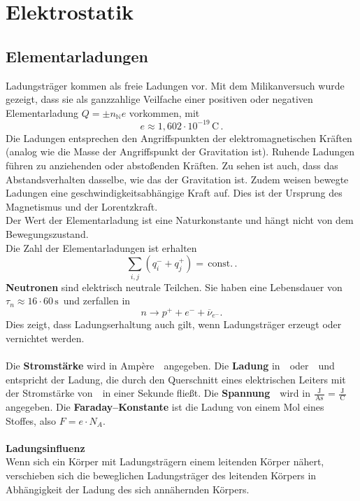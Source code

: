 \documentclass[a4paper,12pt]{article}
\begin{document}
\newpage
\section{Elektrostatik}
\subsection{Elementarladungen}
Ladungsträger kommen als freie Ladungen vor. Mit dem Milikanversuch wurde gezeigt, dass sie als ganzzahlige Veilfache einer positiven oder negativen Elementarladung $Q=\pm n_\mathbb{N} e$ vorkommen, mit
\[ 
        e\approx 1,602\cdot 10^{-19}\,\text{C}\,
.\] 
Die Ladungen entsprechen den Angriffspunkten der elektromagnetischen Kräften (analog wie die Masse der Angriffspunkt der Gravitation ist). Ruhende Ladungen führen zu anziehenden oder abstoßenden Kräften. Zu sehen ist auch, dass das Abstandsverhalten dasselbe, wie das der Gravitation ist. Zudem weisen bewegte Ladungen eine geschwindigkeitsabhängige Kraft auf. Dies ist der Ursprung des Magnetismus und der Lorentzkraft.\\\indent
Der Wert der Elementarladung ist eine Naturkonstante und hängt nicht von dem Bewegungszustand.\\\indent
Die Zahl der Elementarladungen ist erhalten
\[ 
        \sum_{i,j}^{}\left(q^-_i+q^+_j\right)=\,\text{const.}\,
.\] 
\textbf{Neutronen} sind elektrisch neutrale Teilchen. Sie haben eine Lebensdauer von $\tau _n\approx 16\cdot 60\,\text{s}\,$ und zerfallen in
\[ 
        n\rightarrow p^++e^-+\overline{\nu }_{e^-}
.\] 
Dies zeigt, dass Ladungserhaltung auch gilt, wenn Ladungsträger erzeugt oder vernichtet werden.\\\\\indent
Die \textbf{Stromstärke} wird in Amp\`ere \,\, angegeben. Die \textbf{Ladung} in \,\, oder \,\, und entspricht der Ladung, die durch den Querschnitt eines elektrischen Leiters mit der Stromstärke von \,\, in einer Sekunde fließt. Die \textbf{Spannung} \,\, wird in $\tfrac{\,\text{J}\,}{\,\text{As}\,}=\tfrac{\,\text{J}\,}{\,\text{C}\,}$ angegeben. Die \textbf{Faraday--Konstante} ist die Ladung von einem Mol eines Stoffes, also $F=e\cdot N_A$.  
\\\hfill\\\textbf{Ladungsinfluenz}\\ 
Wenn sich ein Körper mit Ladungsträgern einem leitenden Körper nähert, verschieben sich die beweglichen Ladungsträger des leitenden Körpers in Abhängigkeit der Ladung des sich annähernden Körpers.
\end{document}
